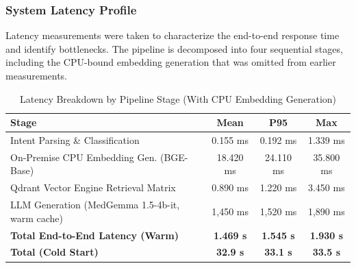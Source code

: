 \subsubsection{System Latency Profile}
Latency measurements were taken to characterize the end-to-end response time and identify bottlenecks. The pipeline is decomposed into four sequential stages, including the CPU-bound embedding generation that was omitted from earlier measurements.

\begin{table}[H]
\centering
\caption{Latency Breakdown by Pipeline Stage (With CPU Embedding Generation)}
\label{tab:latency_breakdown}
\begin{tabular}{lccc}
\hline
\textbf{Stage} & \textbf{Mean} & \textbf{P95} & \textbf{Max} \\
\hline
Intent Parsing \& Classification                 & 0.155 ms  & 0.192 ms  & 1.339 ms  \\
On-Premise CPU Embedding Gen. (BGE-Base)         & 18.420 ms & 24.110 ms & 35.800 ms \\
Qdrant Vector Engine Retrieval Matrix            & 0.890 ms  & 1.220 ms  & 3.450 ms  \\
LLM Generation (MedGemma 1.5-4b-it, warm cache)  & 1,450 ms  & 1,520 ms  & 1,890 ms  \\
\hline
\textbf{Total End-to-End Latency (Warm)}          & \textbf{1.469 s} & \textbf{1.545 s} & \textbf{1.930 s} \\
\textbf{Total (Cold Start)}                        & \textbf{32.9 s}  & \textbf{33.1 s}  & \textbf{33.5 s}  \\
\hline
\end{tabular}
\end{table}

